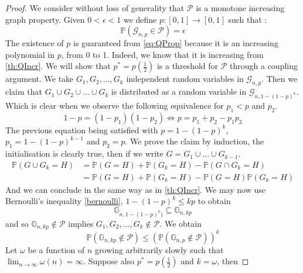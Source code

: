 \begin{proof}
	We consider without loss of generality that $\mathcal{P}$ is a monotone increasing graph property.
	Given $0 < \epsilon < 1$ we define $p:[0,1] \to [0,1]$ such that :
	\begin{equation}
		\mathbb{P}(\mathcal{G}_{n, p} \in \mathcal{P}) = \epsilon
	\end{equation}
	The existence of $p$ is guaranteed from \ref{eq:QProp} because it is an increasing polynomial in $p$, from 0 to 1.
	Indeed, we know that it is increasing from \ref{th:QIncr}.
	\newline
	We will show that $p^* = p(\frac{1}{2})$ is a threshold for $\mathcal{P}$ through a coupling argument.
	We take $G_1, G_2, ..., G_k$ independent random variables in $\mathcal{G}_{n,p}$.
	Then we claim that $G_1 \cup G_2 \cup ... \cup G_k$ is distributed as a random variable in $\mathcal{G}_{n, 1 - (1-p)^k}$.
	Which is clear when we observe the following equivalence for $p_1 < p$ and $p_2$.
	\begin{equation}
		1 - p = (1 - p_1)(1-p_2) \iff p = p_1 + p_2 - p_1p_2
	\end{equation}
	The previous equation being satisfied with $p = 1 -(1-p)^k$, $p_1 = 1 - (1-p)^{k-1}$ and $p_2 = p$.
	\newline
	We prove the claim by induction, the initialisation is clearly true, then if we write $G = G_1 \cup ... \cup G_{k-1}$.
	\begin{align}
		\mathbb{P}(G \cup G_k = H) 	&= \mathbb{P}(G=H) + \mathbb{P}(G_k = H) - \mathbb{P}(G \cap G_k = H) \\ 
						&= \mathbb{P}(G=H) + \mathbb{P}(G_k = H) - \mathbb{P}(G = H)\mathbb{P}(G_k = H) 
	\end{align}
	And we can conclude in the same way as in \ref{th:QIncr}.
	We may now use Bernoulli's inequality \ref{bernoulli}, $1 - (1-p)^k \leq kp$ to obtain
	\begin{equation}
		\mathbb{G}_{n,1 - (1-p)^k)} \subseteq \mathbb{G}_{n, kp}
	\end{equation}
	and so $\mathbb{G}_{n, kp} \not\in \mathcal{P}$ implies $G_1, G_2, ..., G_k \not\in \mathcal{P}$. 
	We obtain
	\begin{equation}
		\mathbb{P}(\mathbb{G}_{n, kp} \not\in \mathcal{P}) \leq (\mathbb{P}(\mathbb{G}_{n,p}\not\in\mathcal{P}))^k
	\end{equation}
	Let $\omega$ be a function of $n$ growing arbitrarily slowly such that $\lim_{n\to\infty}\omega(n) = \infty$. 
	Suppose also $p^* = p(\frac{1}{2})$ and $k=\omega$, then

\end{proof}
